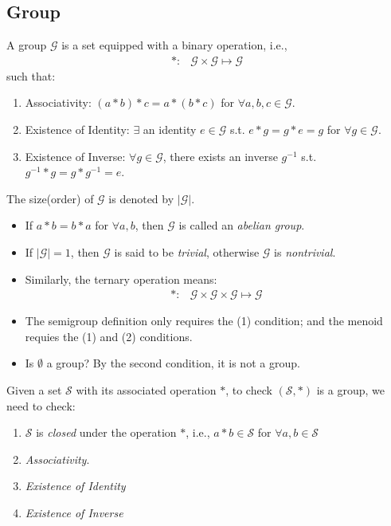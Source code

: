 \subsection{Group}
\begin{definition}[Group]
A group $\mathcal{G}$ is a set equipped with a binary operation, i.e.,
\[
\begin{array}{ll}
*:
&
\mathcal{G}\times\mathcal{G}\mapsto
\mathcal{G}
\end{array}
\]
such that:
\begin{enumerate}
\item
Associativity: 
$(a*b)*c = a*(b*c)$ for $\forall a,b,c\in\mathcal{G}.$
\item
Existence of Identity: 
$\exists$ an identity $e\in\mathcal{G}$ s.t. $e*g = g*e = g$ for $\forall g\in\mathcal{G}$.
\item
Existence of Inverse: 
$\forall g\in\mathcal{G}$, there exists an inverse $g^{-1}$ s.t. $g^{-1}* g=g*g^{-1} = e$.
\end{enumerate}
The size(order) of $\mathcal{G}$ is denoted by $|\mathcal{G}|$.
\end{definition}
\begin{remark}
\begin{itemize}
\item
If $a*b=b*a$ for $\forall a,b$, then $\mathcal{G}$ is called an \emph{abelian group}.
\item
If $|\mathcal{G}|=1$, then $\mathcal{G}$ is said to be \emph{trivial}, otherwise $\mathcal{G}$ is \emph{nontrivial}.  
\item
Similarly, the ternary operation means:
\[
\begin{array}{ll}
*:
&
\mathcal{G}\times\mathcal{G}\times\mathcal{G}\mapsto
\mathcal{G}
\end{array}
\]
\item
The semigroup definition only requires the (1) condition; and the menoid requies the (1) and (2) conditions.
\item
Is $\emptyset$ a group? By the second condition, it is not a group.
\end{itemize}
\end{remark}
Given a set $\mathcal{S}$ with its associated operation $*$, to check $(\mathcal{S},*)$ is a group, we need to check:
\begin{enumerate}
\item
$\mathcal{S}$ is \emph{closed} under the operation $*$, i.e., $a*b\in\mathcal{S}$ for $\forall a,b\in\mathcal{S}$
\item
\emph{Associativity}.
\item
\emph{Existence of Identity}
\item
\emph{Existence of Inverse}
\end{enumerate}

